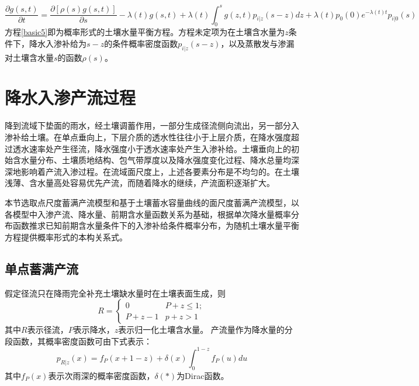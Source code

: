  \begin{equation}
 \label{basic5}
 \frac{\partial{g(s,t)}}{\partial t}=\frac{\partial{[\rho(s)g(s,t)]}}{\partial s}-\lambda(t)g(s,t)+\lambda(t)\int_{0}^{s} g(z,t)p_{i|z}(s-z)dz+\lambda(t)p_0(0)e^{-\lambda(t) t}p_{i|0}(s)
 \end{equation}
方程\ref{basic5}即为概率形式的土壤水量平衡方程。方程未定项为在土壤含水量为$z$条件下，降水入渗补给为$s-z$的条件概率密度函数$p_{i|z}(s-z)$，以及蒸散发与渗漏对土壤含水量$s$的函数$\rho(s)$。


\section{降水入渗产流过程}

降到流域下垫面的雨水，经土壤调蓄作用，一部分生成径流侧向流出，另一部分入渗补给土壤。在单点垂向上，下层介质的透水性往往小于上层介质，在降水强度超过透水速率处产生径流，降水强度小于透水速率处产生入渗补给\cite{ruixiaofang}。土壤垂向上的初始含水量分布、土壤质地结构、包气带厚度以及降水强度变化过程、降水总量均深深地影响着产流入渗过程。在流域面尺度上，上述各要素分布是不均匀的。在土壤浅薄、含水量高处容易优先产流，而随着降水的继续，产流面积逐渐扩大。

本节选取点尺度蓄满产流模型和基于土壤蓄水容量曲线的面尺度蓄满产流模型，以各模型中入渗产流、降水量、前期含水量函数关系为基础，根据单次降水量概率分布函数推求已知前期含水量条件下的入渗补给条件概率分布，为随机土壤水量平衡方程提供概率形式的本构关系式。

\iffalse
鉴于降水产流入渗机制的复杂性以及观测的局限性，通常对该过程进行一定程度的简化。例如，在土壤透水速率大于一般降水强度的条件下，通常认为径流只有在降雨完全补充土壤缺水量时在土壤表面生成，这被称作``蓄满产流''；而在土壤透水率小于一般降水强度时的产流机制称为``超渗产流''。许多简化的产流模型均假设产流量为单次降水总量和研究下垫面前期土壤含水量的函数。本节选用其中具有较强物理意义且应用效果良好的几类产流模型，以模型中入渗产流、降水量、前期含水量函数关系为基础，根据单次降水量概率分布函数推求已知前期含水量条件下的入渗补给条件概率分布，为随机土壤水量平衡方程提供概率形式的本构关系式。
\fi


\subsection{单点蓄满产流}
假定径流只在降雨完全补充土壤缺水量时在土壤表面生成，则
\begin{equation}
R=
 \begin{cases}
 0&{P+z\leq 1};\\P+z-1 &{p+z>1}
 \end{cases}
\end{equation}
其中$R$表示径流，$P$表示降水，$z$表示归一化土壤含水量。
产流量作为降水量的分段函数，其概率密度函数可由下式表示：
\begin{equation}
\label{rpoint}
p_{R|z}(x)=f_P(x+1-z)+\delta(x)\int_{0}^{1-z} f_P(u) du 
\end{equation}
其中$f_P(x)$表示次雨深的概率密度函数，$\delta(*)$为Dirac函数。

